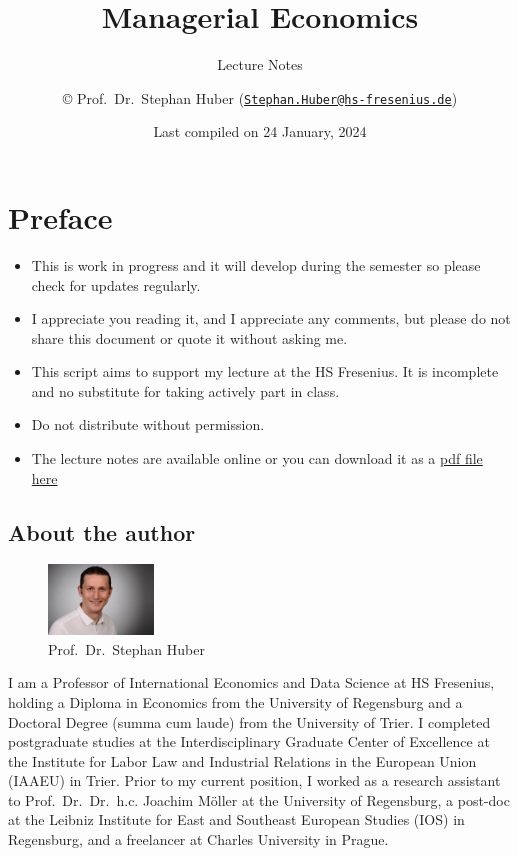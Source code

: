\documentclass[
  12pt,
  oneside]{book}
\title{Managerial Economics}
\subtitle{Lecture Notes}
\author{© Prof.~Dr.~Stephan Huber (\href{mailto:Stephan.Huber@hs-fresenius.de}{\nolinkurl{Stephan.Huber@hs-fresenius.de}})}
\date{Last compiled on 24 January, 2024}
\providecommand{\tightlist}{%
  \setlength{\itemsep}{0pt}\setlength{\parskip}{0pt}}
\theoremstyle{definition}
\theoremstyle{definition}
\theoremstyle{definition}
\theoremstyle{definition}
\theoremstyle{remark}
\begin{document}
\maketitle

{
\hypersetup{linkcolor=}
\setcounter{tocdepth}{2}
\tableofcontents
}
\hypertarget{preface}{%
\chapter*{Preface}\label{preface}}

\begin{itemize}
\tightlist
\item
  This is work in progress and it will develop during the semester so please check for updates regularly.
\item
  I appreciate you reading it, and I appreciate any comments, but please do not share this document or quote it without asking me.
\item
  This script aims to support my lecture at the HS Fresenius. It is incomplete and no substitute
  for taking actively part in class.
\item
  Do not distribute without permission.
\item
  The lecture notes are available online or you can download it as a \href{https://raw.githubusercontent.com/hubchev/hubchev.github.io/main/me/_main.pdf}{pdf file here}
\end{itemize}

\hypertarget{about-the-author}{%
\section*{About the author}\label{about-the-author}}

\begin{figure}
\centering
\includegraphics[width=0.25\textwidth,height=\textheight]{fig/huber2.jpeg}
\caption[\label{fig:itsme} Prof.~Dr.~Stephan Huber]{\label{fig:itsme} Prof.~Dr.~Stephan Huber\footnotemark{}}
\end{figure}

I am a Professor of International Economics and Data Science at HS Fresenius, holding a Diploma in Economics from the University of Regensburg and a Doctoral Degree (summa cum laude) from the University of Trier. I completed postgraduate studies at the Interdisciplinary Graduate Center of Excellence at the Institute for Labor Law and Industrial Relations in the European Union (IAAEU) in Trier. Prior to my current position, I worked as a research assistant to Prof.~Dr.~Dr.~h.c. Joachim Möller at the University of Regensburg, a post-doc at the Leibniz Institute for East and Southeast European Studies (IOS) in Regensburg, and a freelancer at Charles University in Prague.
\end{document}
